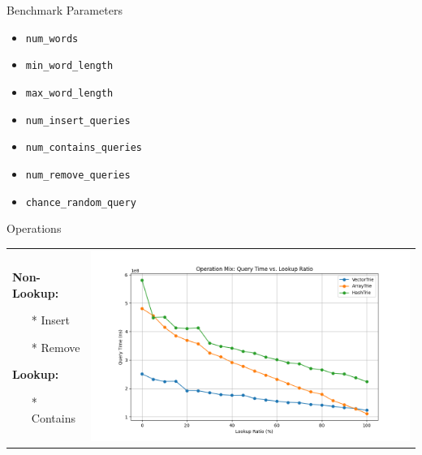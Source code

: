 \documentclass{beamer}
\begin{document}
    \begin{frame}{Benchmark Parameters}
        \begin{itemize}
            \item \texttt{num\_words}
            \item \texttt{min\_word\_length}
            \item \texttt{max\_word\_length}
            \item \texttt{num\_insert\_queries}
            \item \texttt{num\_contains\_queries}
            \item \texttt{num\_remove\_queries}
            \item \texttt{chance\_random\_query}
        \end{itemize}
    \end{frame}

    \begin{frame}{Operations}
        \begin{center}
            \begin{tabular}{m{2.5cm}c}
                \textbf{Non-Lookup:}
                \begin{itemize}
                    \item[*] Insert
                    \item[*] Remove
                \end{itemize}
                \textbf{Lookup:}
                \begin{itemize}
                    \item[*] Contains
                \end{itemize} &
                \includegraphics[width=0.8\linewidth]{plot_operation_mix/plot_operation_mix} \\
            \end{tabular}
        \end{center}
    \end{frame}
\end{document}
